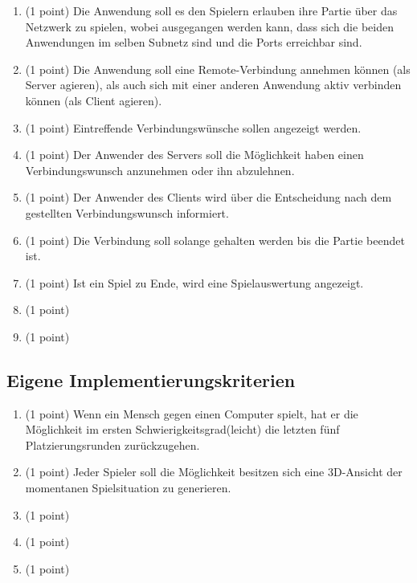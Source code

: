 \documentclass[a4paper]{scrartcl}
\begin{document}
\begin{enumerate}
		\item (1 point) Die Anwendung soll es den Spielern erlauben ihre Partie über das Netzwerk zu spielen, wobei ausgegangen werden kann, dass sich die beiden Anwendungen im selben Subnetz sind und die Ports erreichbar sind.
		\item (1 point) Die Anwendung soll eine Remote-Verbindung annehmen können (als Server agieren), als auch sich mit einer anderen Anwendung aktiv verbinden können (als Client agieren).
		\item (1 point) Eintreffende Verbindungswünsche sollen angezeigt werden.
		\item (1 point) Der Anwender des Servers soll die Möglichkeit haben einen Verbindungswunsch anzunehmen oder ihn abzulehnen.
		\item (1 point) Der Anwender des Clients wird über die Entscheidung nach dem gestellten Verbindungswunsch informiert.
		\item (1 point) Die Verbindung soll solange gehalten werden bis die Partie beendet ist.
		\item (1 point) Ist ein Spiel zu Ende, wird eine Spielauswertung angezeigt.
		\item (1 point) 
		\item (1 point)
	\end{enumerate}
		
\subsection{Eigene Implementierungskriterien}
	\begin{enumerate}
		\item (1 point) Wenn ein Mensch gegen einen Computer spielt, hat er die Möglichkeit im ersten Schwierigkeitsgrad(leicht) die letzten fünf Platzierungsrunden zurückzugehen.
		\item (1 point) Jeder Spieler soll die Möglichkeit besitzen sich eine 3D-Ansicht der momentanen Spielsituation zu generieren.
		\item (1 point) 
		\item (1 point) 
		\item (1 point) 
	\end{enumerate}
\end{document}
